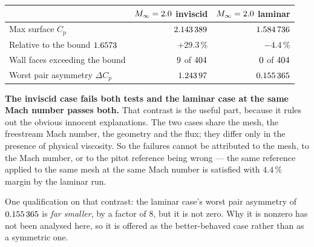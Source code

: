 \begin{center}
\begin{tabular}{lrr}
  \toprule
  & $M_\infty=2.0$ inviscid & $M_\infty=2.0$ laminar \\
  \midrule
  Max surface $C_p$ & $\num{2.143389}$ & $\num{1.584736}$ \\
  Relative to the bound $\num{1.6573}$ & $\mathbf{+29.3\,\%}$ & $-4.4\,\%$ \\
  Wall faces exceeding the bound
    & $\mathbf{\num{9}}$ of $\num{404}$
    & $\num{0}$ of $\num{404}$ \\
  Worst pair asymmetry $\Delta C_p$
    & $\mathbf{\num{1.24397}}$ & $\num{0.155365}$ \\
  \bottomrule
\end{tabular}
\end{center}

\noindent \textbf{The inviscid case fails both tests and the laminar case at the same Mach
number passes both.} That contrast is the useful part, because it rules out the obvious
innocent explanations. The two cases share the mesh, the freestream Mach number, the
geometry and the flux; they differ only in the presence of physical viscosity. So the
failures cannot be attributed to the mesh, to the Mach number, or to the pitot reference
being wrong --- the same reference applied to the same mesh at the same Mach number is
satisfied with $4.4\,\%$ margin by the laminar run.

One qualification on that contrast: the laminar case's worst pair asymmetry of
$\num{0.155365}$ is
\emph{far smaller}, by a factor of $8$, but it is not zero. Why it is nonzero has not been
analysed here, so it is offered as the better-behaved case rather than as a symmetric one.

